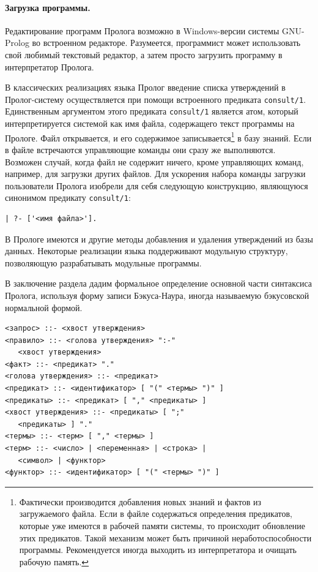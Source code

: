 \documentclass[12pt, openany, twoside]{book} %
\begin{document}
\paragraph{Загрузка программы.} Редактирование программ Пролога возможно в Windows-версии системы GNU-Prolog во встроенном редакторе. Разумеется, программист может использовать свой любимый текстовый редактор, а затем просто загрузить программу в интерпретатор Пролога.

В классических реализациях языка Пролог введение списка утверждений в Пролог-систему осуществляется при помощи встроенного предиката {\tt consult/1}. Единственным аргументом этого предиката {\tt consult/1} является атом, который интерпретируется системой как имя файла, содержащего текст программы на Прологе. Файл открывается, и его содержимое записывается\footnote{Фактически производится добавления новых знаний и фактов из загружаемого файла. Если в файле содержаться определения предикатов, которые уже имеются в рабочей памяти системы, то происходит обновление этих предикатов. Такой механизм может быть причиной неработоспособности программы. Рекомендуется иногда выходить из интерпретатора и очищать рабочую память.} в базу знаний. Если в файле встречаются управляющие команды они сразу же выполняются. Возможен случай, когда файл не содержит ничего, кроме управляющих команд, например, для загрузки других файлов. Для ускорения набора команды загрузки пользователи Пролога изобрели для себя следующую конструкцию, являющуюся синонимом предикату {\tt consult/1}:
{\tt\begin{verbatim}
| ?- ['<имя файла>'].
\end{verbatim}}

В Прологе имеются и другие методы добавления и удаления утверждений из базы данных. Некоторые реализации языка поддерживают модульную структуру, позволяющую разрабатывать модульные программы.

В заключение раздела дадим формальное определение основной части синтаксиса Пролога, используя форму записи Бэкуса-Наура, иногда называемую бэкусовской нормальной формой.

{\tt\begin{verbatim}
<запрос> ::- <хвост утверждения>
<правило> ::- <голова утверждения> ":-"
   <хвост утверждения>
<факт> ::- <предикат> "."
<голова утверждения> ::- <предикат>
<предикат> ::- <идентификатор> [ "(" <термы> ")" ]
<предикаты> ::- <предикат> [ "," <предикаты> ]
<хвост утверждения> ::- <предикаты> [ ";"
   <предикаты> ] "."
<термы> ::- <терм> [ "," <термы> ]
<терм> ::- <число> | <переменная> | <строка> |
   <символ> | <функтор>
<функтор> ::- <идентификатор> [ "(" <термы> ")" ]
\end{verbatim}}
\end{document}
